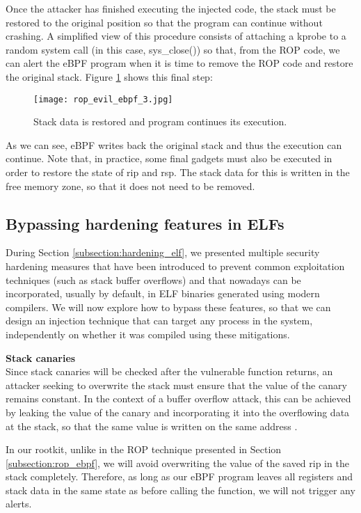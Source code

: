 Once the attacker has finished executing the injected code, the stack must be restored to the original position so that the program can continue without crashing. A simplified view of this procedure consists of attaching a kprobe to a random system call (in this case, sys\_close()) so that, from the ROP code, we can alert the eBPF program when it is time to remove the ROP code and restore the original stack. Figure \ref{fig:rop_evil_ebpf_3} shows this final step:

\begin{figure}[H]
	\centering
	\texttt{[image: rop\_evil\_ebpf\_3.jpg]}
	\caption{Stack data is restored and program continues its execution.}
	\label{fig:rop_evil_ebpf_3}
\end{figure}

As we can see, eBPF writes back the original stack and thus the execution can continue. Note that, in practice, some final gadgets must also be executed in order to restore the state of rip and rsp. The stack data for this is written in the free memory zone, so that it does not need to be removed.



\subsection{Bypassing hardening features in ELFs} \label{subsection:hardening_bypass}
During Section \ref{subsection:hardening_elf}, we presented multiple  security hardening measures that have been introduced to prevent common exploitation techniques (such as stack buffer overflows) and that nowadays can be incorporated, usually by default, in ELF binaries generated using modern compilers. We will now explore how to bypass these features, so that we can design an injection technique that can target any process in the system, independently on whether it was compiled using these mitigations.

\textbf{Stack canaries}\\
Since stack canaries will be checked after the vulnerable function returns, an attacker seeking to overwrite the stack must ensure that the value of the canary remains constant. In the context of a buffer overflow attack, this can be achieved by leaking the value of the canary and incorporating it into the overflowing data at the stack, so that the same value is written on the same address \cite{canary_exploit}.

In our rootkit, unlike in the ROP technique presented in Section \ref{subsection:rop_ebpf}, we will avoid overwriting the value of the saved rip in the stack completely. Therefore, as long as our eBPF program leaves all registers and stack data in the same state as before calling the function, we will not trigger any alerts.

